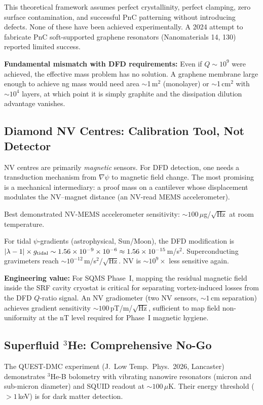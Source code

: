 \documentclass[11pt]{article}
\theoremstyle{definition}
\theoremstyle{remark}
\newcommand{\ee}[1]{\times 10^{#1}}
\begin{document}
This theoretical framework assumes perfect crystallinity, perfect
clamping, zero surface contamination, and successful PnC patterning
without introducing defects. None of these have been achieved
experimentally. A 2024 attempt to fabricate PnC soft-supported
graphene resonators (Nanomaterials 14, 130) reported limited success.

\textbf{Fundamental mismatch with DFD requirements:} Even if
$Q \sim 10^9$ were achieved, the effective mass problem has no
solution. A graphene membrane large enough to achieve ng mass would
need area $\sim$1\,m$^2$ (monolayer) or $\sim$1\,cm$^2$ with
$\sim 10^4$ layers, at which point it is simply graphite and the
dissipation dilution advantage vanishes.


\subsection{Diamond NV Centres: Calibration Tool, Not Detector}

NV centres are primarily \textit{magnetic} sensors. For DFD detection,
one needs a transduction mechanism from $\nabla\psi$ to magnetic field
change. The most promising is a mechanical intermediary: a proof mass
on a cantilever whose displacement modulates the NV--magnet distance
(an NV-read MEMS accelerometer).

Best demonstrated NV-MEMS accelerometer sensitivity: $\sim
100$\,$\mu$g/$\sqrt{\text{Hz}}$ at room temperature.

For tidal $\psi$-gradients (astrophysical, Sun/Moon), the DFD
modification is $|\lambda - 1| \times g_{\rm tidal} \sim 1.56\ee{-9}
\times 10^{-6} \approx 1.56\ee{-15}$\,m/s$^2$. Superconducting
gravimeters reach $\sim 10^{-12}$\,m/s$^2/\sqrt{\text{Hz}}$. NV
is $\sim 10^9\times$ less sensitive again.

\textbf{Engineering value:} For SQMS Phase~I, mapping the residual
magnetic field inside the SRF cavity cryostat is critical for
separating vortex-induced losses from the DFD $Q$-ratio signal. An
NV gradiometer (two NV sensors, $\sim 1$\,cm separation) achieves
gradient sensitivity $\sim 100$\,pT/m/$\sqrt{\text{Hz}}$, sufficient
to map field non-uniformity at the nT level required for Phase~I
magnetic hygiene.


\subsection{Superfluid $^3$He: Comprehensive No-Go}

The QUEST-DMC experiment (J.\ Low Temp.\ Phys.\ 2026, Lancaster)
demonstrates $^3$He-B bolometry with vibrating nanowire resonators
(micron and sub-micron diameter) and SQUID readout at $\sim 100$\,$\mu$K.
Their energy threshold ($> 1$\,keV) is for dark matter detection.
\end{document}
